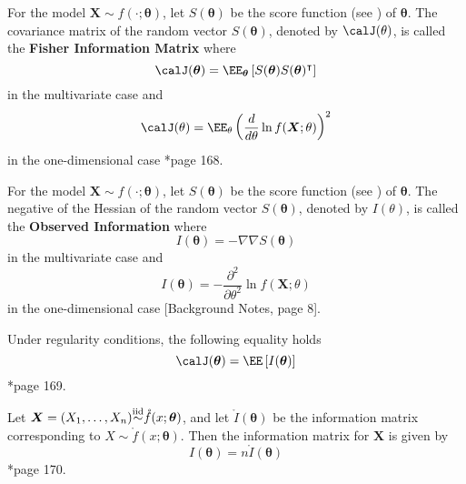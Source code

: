 \begin{defe} \label{defe: fim}
    For the model $\bm{X} \sim f(\cdot ; \bm{\theta})$, let $S(\bm{\theta})$ be the score function (see ) of $\bm{\theta}$. The covariance matrix of the random vector $S(\bm{\theta})$, denoted by $\calJ (\theta)$, is called the {\bf Fisher Information Matrix} where
    \begin{equation*}
        \calJ (\bm{\theta}) = \EE_{\bm{\theta}} \left[ S(\bm{\theta}) S(\bm{\theta})^{\intercal} \right]
    \end{equation*}
    in the multivariate case and
    \begin{equation*}
        \calJ (\theta) = \EE_{\theta} \left( \frac{d}{d \theta} \ln f(\bm{X} ; \theta) \right)^2
    \end{equation*}
    in the one-dimensional case \cite{KroeseDirkP2013SMaC}*{page 168}.
\end{defe}

\begin{defe} \label{defe: oim}
    For the model $\bm{X} \sim f(\cdot ; \bm{\theta})$, let $S(\bm{\theta})$ be the score function (see ) of $\bm{\theta}$. The negative of the Hessian of the random vector $S(\bm{\theta})$, denoted by $I (\theta)$, is called the {\bf Observed Information} where
    \begin{equation*}
        I (\bm{\theta}) = - \nabla \nabla S(\bm{\theta})
    \end{equation*}
    in the multivariate case and
    \begin{equation*}
        I (\bm{\theta}) = - \frac{\partial^2}{\partial \theta^2} \ln f(\bm{X} ; \theta)
    \end{equation*}
    in the one-dimensional case [Background Notes, page 8].
\end{defe}

\begin{thm} \label{thm: fim_and_oim}
    Under regularity conditions, the following equality holds
    \begin{equation*}
        \calJ (\bm{\theta}) = \EE \left[ I (\bm{\theta}) \right]
    \end{equation*}
    \cite{KroeseDirkP2013SMaC}*{page 169}.
\end{thm}

\begin{thm} \label{thm: fim_iid}
    Let $\bm{X} = (X_1 , \ldots , X_n) {\overset{\text{iid}}{\sim}} \mathring{f} (x ; \bm{\theta})$, and let $\mathring{I} (\bm{\theta})$ be the information matrix corresponding to $X \sim \mathring{f} (x ; \bm{\theta})$. Then the information matrix for $\bm{X}$ is given by
    \begin{equation*}
        I (\bm{\theta}) = n \mathring{I} (\bm{\theta})
    \end{equation*}
    \cite{KroeseDirkP2013SMaC}*{page 170}.
\end{thm}

